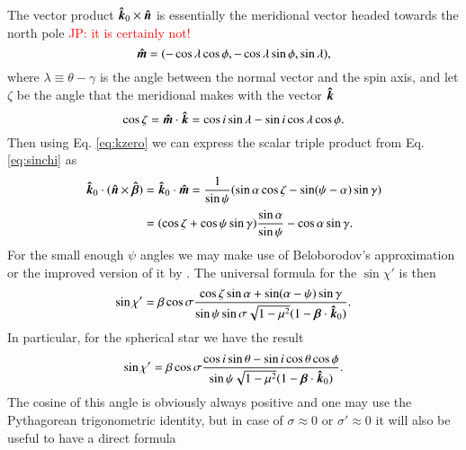 \documentclass{aa}
\newcommand{\be}{\begin{equation}}
\newcommand{\ee}{\end{equation}}
\newcommand{\unit}[1]{\mbox{\boldmath $\hat{#1}$}}
\newcommand{\red}[1]{\textcolor{red}{#1}}
\begin{document}
The vector product $\unit{k}_0 \times \unit{n}$ is essentially %
the meridional vector headed towards the north pole \red{JP: it is certainly not!}
\be
\unit{m} = (- \cos \lambda \cos \phi, -\cos \lambda \sin \phi, \sin \lambda ),
\ee
where $\lambda \equiv \theta-\gamma$ is the angle between the normal vector and the spin axis, and let $\zeta$ be the angle that the meridional makes with the vector $\unit{k}$
\begin{equation}\label{eq:zeta_defined}
\cos \zeta = \unit{m} \cdot \unit{k} = \cos i \sin \lambda - \sin i \cos \lambda \cos \phi.
\end{equation}
Then using Eq. \eqref{eq:kzero} we can express the scalar triple product  %
from  Eq. \eqref{eq:sinchi}  as
\begin{align}\label{eq:tripleproductpherical}
\unit{k}_0 \cdot (\unit{n}\times\unit{\beta} )&=\unit{k}_0 \cdot \unit{m} 
= \frac1{\sin\psi}(\sin \alpha \cos \zeta - \sin(\psi-\alpha)\sin\gamma ) \nonumber	\\
&= (\cos\zeta+\cos\psi \sin\gamma)\frac{\sin\alpha}{\sin\psi} - \cos \alpha\sin\gamma.
\end{align}
%
For the small enough $\psi$ angles we may make use of Beloborodov's approximation \citep{B02} or the improved version of it by \citet{poutanen19}. 
The universal formula for the $\sin\chi'$ is then 
\be\label{eq:sinchiprime}
\sin\chi'={\beta \cos\sigma }
\frac{
\cos\zeta \sin\alpha+\sin(\alpha-\psi) \sin\gamma}
{\sin\psi\sin{\sigma}\sqrt{1-\mu^2}  (1-\bm \beta \cdot \unit{k}_0) }.
\ee  
In particular, for the spherical star we have the result 
\be\label{eq:chiprimespherical}
\sin{\chi'} =
\beta \cos\sigma \frac{\cos i \sin \theta - \sin i \cos \theta \cos \phi}{\sin{\psi}\sqrt{1-\mu^2} (1-\bm \beta \cdot \unit{k}_0)}.
\ee
The cosine of this angle is obviously always positive and one may use the Pythagorean trigonometric identity, but in case of $\sigma\approx0$ or $ \sigma'\approx0$ it will also be useful to have a direct formula 
\end{document}
